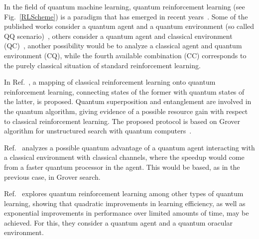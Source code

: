 \documentclass[12pt]{iopart}
\begin{document}
In the field of quantum machine learning, quantum reinforcement learning (see Fig.~\ref{RLScheme}) is a paradigm that has emerged in recent years~\cite{DongQRL,PaparoPRX,DunjkoPRL,LamataQRL,CardenasQRL,AlbarranQRL,ShangYuQRL,AlbarranMLST,MarquardtRL,BukovPRX}. Some of the published works consider a quantum agent and a quantum environment (so called QQ scenario)~\cite{DunjkoPRL,LamataQRL,CardenasQRL,AlbarranQRL,ShangYuQRL,AlbarranMLST}, others consider a quantum agent and classical environment (QC)~\cite{DongQRL,PaparoPRX,DunjkoPRL}, another possibility would be to analyze a classical agent and quantum environment (CQ), while the fourth available combination (CC) corresponds to the purely classical situation of standard reinforcement learning.

In Ref.~\cite{DongQRL}, a mapping of classical reinforcement learning onto quantum reinforcement learning, connecting states of the former with quantum states of the latter, is proposed. Quantum superposition and entanglement are involved in the quantum algorithm, giving evidence of a possible resource gain with respect to classical reinforcement learning. The proposed protocol is based on Grover algorithm for unstructured search with quantum computers~\cite{Grover}. 

Ref.~\cite{PaparoPRX} analyzes a possible quantum advantage of a quantum agent interacting with a classical environment with classical channels, where the speedup would come from a faster quantum processor in the agent. This would be based, as in the previous case, in Grover search.

Ref.~\cite{DunjkoPRL} explores quantum reinforcement learning among other types of quantum learning, showing that quadratic improvements in learning efficiency, as well as exponential improvements in performance over limited amounts of time, may be achieved. For this, they consider a quantum agent and a quantum oracular environment.
\end{document}
